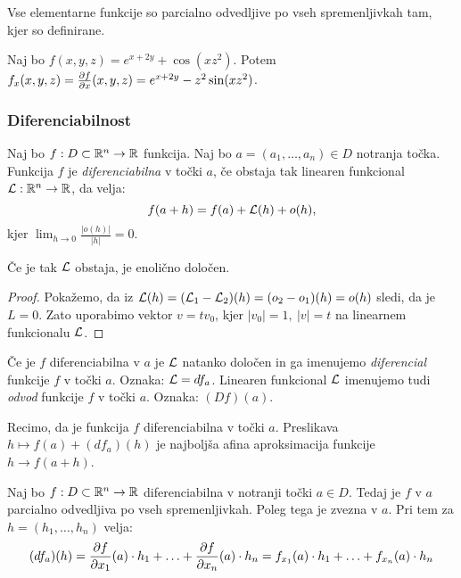 \begin{opomba}
    Vse elementarne funkcije so parcialno odvedljive po vseh spremenljivkah tam, kjer so definirane.
\end{opomba}

\begin{zgled}
    Naj bo $f(x, y, z) = e^{x+2y} + \cos(xz^2)$. Potem $f_x(x, y, z) = \frac{\partial f}{\partial x}(x, y, z) = e^{x+2y} - z^2 \sin(xz^2)$.
\end{zgled}

\subsubsection{Diferenciabilnost}
\begin{definicija}
    Naj bo $f: D \subset \mathbb{R}^n \to \mathbb{R}$ funkcija. Naj bo $a = (a_1, \ldots, a_n) \in D$ notranja točka. Funkcija $f$ je \emph{diferenciabilna} v točki $a$, če obstaja tak linearen funkcional $\mathcal{L}: \mathbb{R}^n \to \mathbb{R}$, da velja:
    $$f(a+h) = f(a) + \mathcal{L}(h) + o(h),$$
    kjer $\lim_{h \to 0} \frac{|o(h)|}{|h|} = 0$.
\end{definicija}

\begin{opomba}
    Če je tak $\mathcal{L}$ obstaja, je enolično določen.
\end{opomba}

\begin{proof}
    Pokažemo, da iz $\mathcal{L}(h) = (\mathcal{L}_1 - \mathcal{L}_2)(h) = (o_2 - o_1)(h) = o(h)$ sledi, da je $L = 0$. Zato uporabimo vektor $v = tv_0$, kjer $|v_0| = 1, \ |v| = t$ na linearnem funkcionalu $\mathcal{L}$.
\end{proof}

\begin{definicija}
    Če je $f$ diferenciabilna v $a$ je $\mathcal{L}$ natanko določen in ga imenujemo \emph{diferencial} funkcije $f$ v točki $a$. Oznaka: $\mathcal{L} = df_a$. Linearen funkcional $\mathcal{L}$ imenujemo tudi \emph{odvod} funkcije $f$ v točki $a$. Oznaka: $(Df)(a)$.
\end{definicija}

\begin{opomba}
    Recimo, da je funkcija $f$ diferenciabilna v točki $a$. Preslikava $h \mapsto f(a) + (df_a)(h)$ je najboljša afina aproksimacija funkcije $h \to f(a+h)$.
\end{opomba}

\begin{trditev}
    Naj bo $f: D \subset \mathbb{R}^n \to \mathbb{R}$ diferenciabilna v notranji točki $a \in D$. Tedaj je $f$ v $a$ parcialno odvedljiva po vseh spremenljivkah. Poleg tega je zvezna v $a$. Pri tem za $h = (h_1, \ldots, h_n)$ velja:
    $$(df_a)(h) = \frac{\partial f}{\partial x_1}(a) \cdot h_1 + \ldots + \frac{\partial f}{\partial x_n}(a) \cdot h_n = f_{x_1}(a) \cdot h_1 + \ldots + f_{x_n}(a) \cdot h_n$$
\end{trditev}

